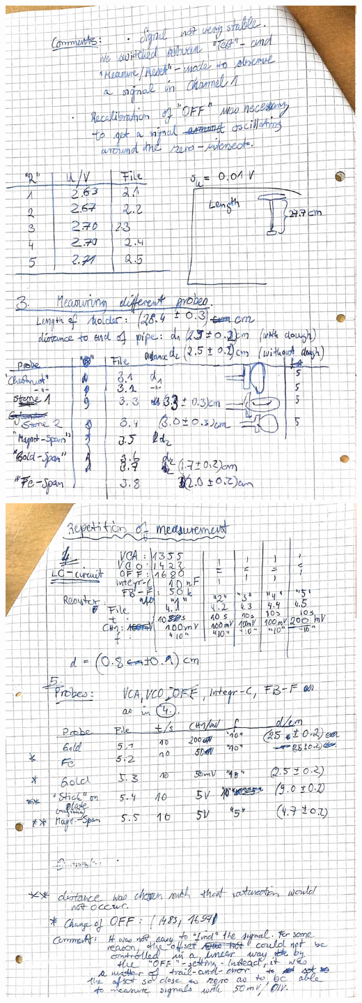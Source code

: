     \includegraphics[width=\linewidth]{appendix/page2.jpeg}
    \clearpage
    \includegraphics[width=\linewidth]{appendix/page3.jpeg}
\clearpage
\FloatBarrier

